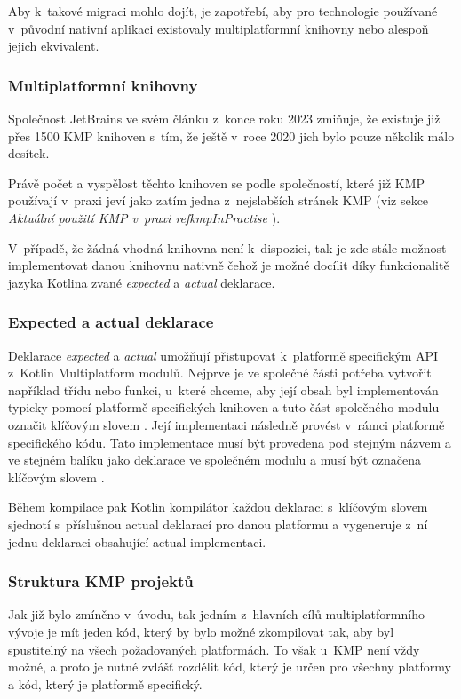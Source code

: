 Aby k~takové migraci mohlo dojít, je zapotřebí, aby pro technologie používané v~původní nativní aplikaci existovaly multiplatformní
knihovny nebo alespoň jejich ekvivalent.

\subsubsection*{Multiplatformní knihovny}
Společnost JetBrains ve svém článku z~konce roku 2023 zmiňuje, že existuje již přes 1500 KMP knihoven s~tím, že ještě v~roce 2020
jich bylo pouze několik málo desítek. \cite{KMPstable}

Právě počet a vyspělost těchto knihoven se podle společností, které již KMP používají v~praxi jeví jako zatím jedna z~nejslabších stránek KMP 
(viz sekce \textit{Aktuální použití KMP v~praxi ref{kmpInPractise}
}).

V~případě, že žádná vhodná knihovna není k~dispozici, tak je zde stále možnost implementovat danou knihovnu nativně čehož je možné docílit díky funkcionalitě jazyka Kotlina
zvané \textit{expected} a \textit{actual} deklarace.

\subsubsection*{Expected a actual deklarace}\label{expectActual}
Deklarace \textit{expected} a \textit{actual} umožňují přistupovat k~platformě specifickým API z~Kotlin Multiplatform modulů. \cite{KMPExpectActual}
Nejprve je ve společné části potřeba vytvořit například třídu nebo funkci, u~které chceme, aby její obsah byl implementován typicky pomocí
platformě specifických knihoven a tuto část společného modulu označit klíčovým slovem . \cite{KMPExpectActual} Její implementaci následně provést v~rámci
platformě specifického kódu. Tato implementace musí být provedena pod stejným názvem a ve stejném balíku jako deklarace ve společném modulu
a musí být označena klíčovým slovem . \cite{KMPExpectActual}

Během kompilace pak Kotlin kompilátor každou deklaraci s~klíčovým slovem  sjednotí s~příslušnou actual deklarací pro danou platformu
a vygeneruje z~ní jednu deklaraci obsahující actual implementaci. \cite{KMPExpectActual}

\subsubsection*{Struktura KMP projektů}\label{projectStructure}
Jak již bylo zmíněno v~úvodu, tak jedním z~hlavních cílů multiplatformního vývoje je mít 
jeden kód, který by bylo možné zkompilovat tak, aby byl spustitelný na všech požadovaných platformách. To však u~KMP není vždy 
možné, a proto je nutné zvlášť rozdělit kód, který je určen pro všechny platformy a kód, který je platformě specifický. 

